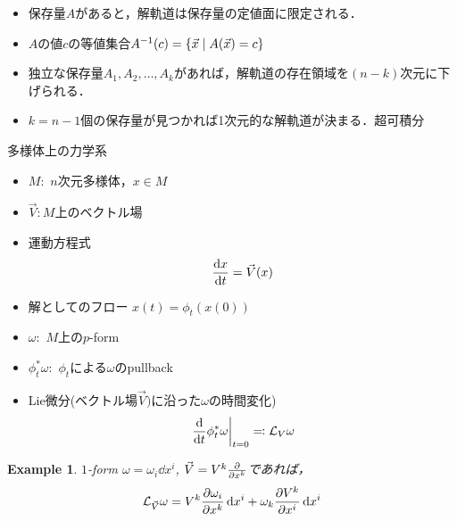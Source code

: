 \documentclass[dvipdfmx]{beamer}
\theoremstyle{break}
\newtheorem{eg}[thm]{Example}
\renewcommand{\L}{\mathcal{L}}
\begin{document}
\begin{frame}
		\begin{itemize}
				\item 保存量$A $があると，解軌道は保存量の定値面に限定される．
				\item $A $の値$c $の等値集合$A^{-1}(c) = \qty{\vec{x}\mid A(\vec{x}) = c} $
				\item 独立な保存量$A_1, A_2, \ldots, A_k $があれば，解軌道の存在領域を$(n-k) $次元に下げられる．
				\item $k = n-1 $個の保存量が見つかれば1次元的な解軌道が決まる．\alert{超可積分}
		\end{itemize}
\end{frame}

\begin{frame}{多様体上の力学系}
		\begin{itemize}
				\item $M\colon $ $n $次元多様体，$x\in M $
				\item $\vec{V}\colon $$M $上のベクトル場
				\item 運動方程式
						\begin{align}
								\dv{x}{t} = \vec{V}(x)
						\end{align}
				\item 解としてのフロー $x(t) = \phi_t(x(0)) $
				\item $\omega\colon $ $M $上の$p $-form
				\item $\phi_t^{*}\omega\colon $ $\phi_t $による$\omega $のpullback
				\item Lie微分(ベクトル場$\vec{V})$に沿った$\omega $の時間変化)
						\begin{align}
								\left.\dv{}{t}\phi_t^{*}\omega\right|_{t=0} \eqqcolon \L _V\omega
						\end{align}
		\end{itemize}
\end{frame}

\begin{frame}
		\begin{eg}
				$1 $-form $\omega =\omega_i\dd{x^i}$, $\vec{V} = V^{k}\pdv{}{x^{k}} $であれば，
				\begin{align}
						\L_{\vec{V}}\omega = V^k\pdv{\omega_i}{x^k}\dd{x^i} + \omega_k\pdv{V^k}{x^i}\dd{x^i}
				\end{align}
		\end{eg}
\end{frame}
\end{document}
